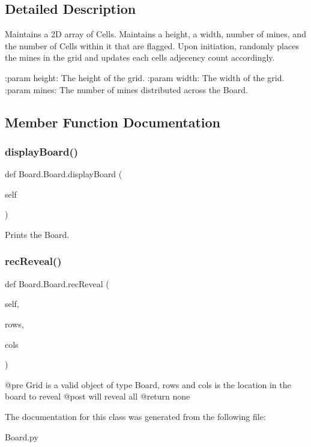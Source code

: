 \subsection{Detailed Description}
\begin{DoxyVerb}Maintains a 2D array of Cells. Maintains a height, a width, number of mines,
and the number of Cells within it that are flagged. Upon initiation,
randomly places the mines in the grid and updates each cells adjecency count
accordingly.

:param height: The height of the grid.
:param width: The width of the grid.
:param mines: The number of mines distributed across the Board.
\end{DoxyVerb}
 

\subsection{Member Function Documentation}
\mbox{\label{class_board_1_1_board_af52ea18259bf8d2a122de08fcb0ea308}} 
\subsubsection{\texorpdfstring{display\+Board()}{displayBoard()}}
{\footnotesize\ttfamily def Board.\+Board.\+display\+Board (\begin{DoxyParamCaption}\item[{}]{self }\end{DoxyParamCaption})}

\begin{DoxyVerb}Prints the Board.
\end{DoxyVerb}
 \mbox{\label{class_board_1_1_board_a4a027666af1fa52582af6543985a73c6}} 
\subsubsection{\texorpdfstring{rec\+Reveal()}{recReveal()}}
{\footnotesize\ttfamily def Board.\+Board.\+rec\+Reveal (\begin{DoxyParamCaption}\item[{}]{self,  }\item[{}]{rows,  }\item[{}]{cols }\end{DoxyParamCaption})}

\begin{DoxyVerb}@pre    Grid is a valid object of type Board, rows and cols is the location in the board to reveal
    @post   will reveal all
    @return none
\end{DoxyVerb}
 

The documentation for this class was generated from the following file\+:\begin{DoxyCompactItemize}
\item 
Board.\+py\end{DoxyCompactItemize}
